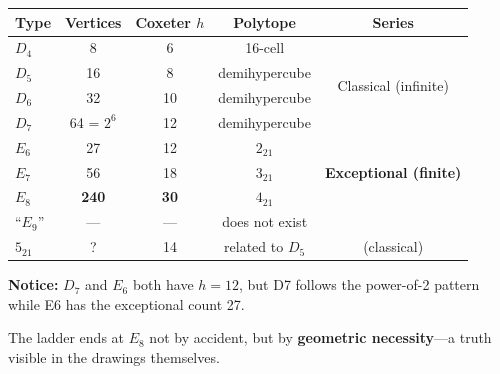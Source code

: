 \documentclass[11pt]{article}
\begin{document}
\begin{center}
\begin{tabular}{lcccc}
\hline
Type & Vertices & Coxeter $h$ & Polytope & Series \\
\hline
$D_4$ & 8 & 6 & 16-cell & \multirow{4}{*}{Classical (infinite)} \\
$D_5$ & 16 & 8 & demihypercube & \\
$D_6$ & 32 & 10 & demihypercube & \\
$D_7$ & 64 = $2^6$ & 12 & demihypercube & \\
\hline
$E_6$ & 27 & 12 & $2_{21}$ & \multirow{3}{*}{\textbf{Exceptional (finite)}} \\
$E_7$ & 56 & 18 & $3_{21}$ & \\
$E_8$ & \textbf{240} & \textbf{30} & $4_{21}$ & \\
\hline
``$E_9$'' & --- & --- & does not exist & \\
$5_{21}$ & ? & 14 & related to $D_5$ & (classical) \\
\hline
\end{tabular}
\end{center}

\textbf{Notice:} $D_7$ and $E_6$ both have $h=12$, but D7 follows the power-of-2 pattern
while E6 has the exceptional count 27.

The ladder ends at $E_8$ not by accident, but by \textbf{geometric necessity}---a
truth visible in the drawings themselves.
\end{document}

